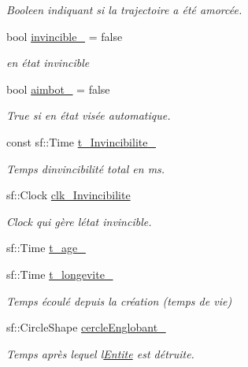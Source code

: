 \begin{DoxyCompactItemize}
\begin{DoxyCompactList}\small\item\em Booleen indiquant si la trajectoire a été amorcée. \end{DoxyCompactList}\item 
bool \mbox{\hyperlink{class_entite_a3a39c039df38b442068bc87afe397e1a}{invincible\+\_\+}} = false
\begin{DoxyCompactList}\small\item\em en état invincible \end{DoxyCompactList}\item 
bool \mbox{\hyperlink{class_entite_aedba9766e8c3a34725a948299b81bdc7}{aimbot\+\_\+}} = false
\begin{DoxyCompactList}\small\item\em True si en état visée automatique. \end{DoxyCompactList}\item 
const sf\+::\+Time \mbox{\hyperlink{class_entite_a05cf4dbc79033259ac661a6a114cdb12}{t\+\_\+\+Invincibilite\+\_\+}}
\begin{DoxyCompactList}\small\item\em Temps d\textquotesingle{}invincibilité total en ms. \end{DoxyCompactList}\item 
sf\+::\+Clock \mbox{\hyperlink{class_entite_aec0eb3d4f1e99db7ae737df33310028c}{clk\+\_\+\+Invincibilite}}
\begin{DoxyCompactList}\small\item\em Clock qui gère l\textquotesingle{}état invincible. \end{DoxyCompactList}\item 
sf\+::\+Time \mbox{\hyperlink{class_entite_ae0006c0f3415e59ad8fd69385c8c5d03}{t\+\_\+age\+\_\+}}
\item 
sf\+::\+Time \mbox{\hyperlink{class_entite_a79f856f9363a2e554b780d720a4164a0}{t\+\_\+longevite\+\_\+}}
\begin{DoxyCompactList}\small\item\em Temps écoulé depuis la création (temps de vie) \end{DoxyCompactList}\item 
sf\+::\+Circle\+Shape \mbox{\hyperlink{class_entite_a5b6c62e4dc54221a84ce4dc824fdb2da}{cercle\+Englobant\+\_\+}}
\begin{DoxyCompactList}\small\item\em Temps après lequel l\textquotesingle{}\mbox{\hyperlink{class_entite}{Entite}} est détruite. \end{DoxyCompactList}\item 

\end{DoxyCompactItemize}
